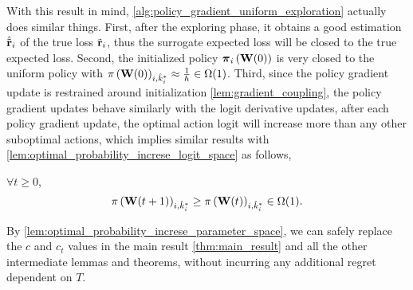 With this result in mind, \cref{alg:policy_gradient_uniform_exploration} actually does similar things. First, after the exploring phase, it obtains a good estimation $\hat{{\tilde{\mathbf{r}}}}_i$ of the true loss ${\tilde{\mathbf{r}}}_i$, thus the surrogate expected loss will be closed to the true expected loss. Second, the initialized policy ${\boldsymbol{\pi}}_i\left( {\mathbf{W}}(0) \right)$ is very closed to the uniform policy with $\pi\left( {\mathbf{W}}(0)\right)_{i, \hat{k}_i^*} \approx \frac{1}{h} \in \Omega(1)$. Third, since the policy gradient update is restrained around initialization \cref{lem:gradient_coupling}, the policy gradient updates behave similarly with the logit derivative updates, after each policy gradient update, the optimal action logit will increase more than any other  suboptimal actions, which implies similar results with \cref{lem:optimal_probability_increse_logit_space} as follows,
\begin{lem}
\label{lem:optimal_probability_increse_parameter_space}
$\forall t \ge 0$,
\begin{equation*}
    \pi\left( {\mathbf{W}}(t+1)\right)_{i,\hat{k}_i^*} \ge \pi\left( {\mathbf{W}}(t)\right)_{i,\hat{k}_i^*} \in \Omega(1).
\end{equation*}
\end{lem}
By \cref{lem:optimal_probability_increse_parameter_space}, we can safely replace the $c$ and $c_t$ values in the main result \cref{thm:main_result} and all the other intermediate lemmas and theorems, without incurring any additional regret dependent on $T$.